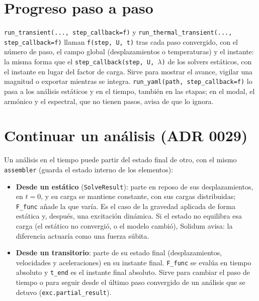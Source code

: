 \documentclass[11pt,oneside]{report}
\begin{document}
\section{Progreso paso a paso}

\texttt{run\_\allowbreak{}transient(.\allowbreak{}.\allowbreak{}.\allowbreak{}, step\_\allowbreak{}callback=f)} y \texttt{run\_\allowbreak{}thermal\_\allowbreak{}transient(.\allowbreak{}.\allowbreak{}.\allowbreak{}, step\_\allowbreak{}callback=f)} llaman \texttt{f(step, U, t)} tras cada paso convergido, con el número de paso, el campo global (desplazamientos o temperaturas) y el instante: la misma forma que el \texttt{step\_\allowbreak{}callback(step, U, \ensuremath{\lambda})} de los solvers estáticos, con el instante en lugar del factor de carga. Sirve para mostrar el avance, vigilar una magnitud o exportar mientras se integra. \texttt{run\_\allowbreak{}yaml(path, step\_\allowbreak{}callback=f)} lo pasa a los análisis estáticos y en el tiempo, también en las etapas; en el modal, el armónico y el espectral, que no tienen pasos, avisa de que lo ignora.

\section{Continuar un análisis (ADR 0029)}

Un análisis en el tiempo puede partir del estado final de otro, con el mismo \texttt{assembler} (guarda el estado interno de los elementos):

\begin{itemize}
  \item \textbf{Desde un estático} (\texttt{SolveResult}): parte en reposo de sus desplazamientos, en $t = 0$, y su carga se mantiene constante, con sus cargas distribuidas; \texttt{F\_func} añade la que varía. Es el caso de la gravedad aplicada de forma estática y, después, una excitación dinámica. Si el estado no equilibra esa carga (el estático no convergió, o el modelo cambió), Solidum avisa: la diferencia actuaría como una fuerza súbita.
  \item \textbf{Desde un transitorio}: parte de su estado final (desplazamientos, velocidades y aceleraciones) en su instante final. \texttt{F\_func} se evalúa en tiempo absoluto y \texttt{t\_end} es el instante final absoluto. Sirve para cambiar el paso de tiempo o para seguir desde el último paso convergido de un análisis que se detuvo (\texttt{exc.\allowbreak{}partial\_\allowbreak{}result}).
\end{itemize}
\end{document}
